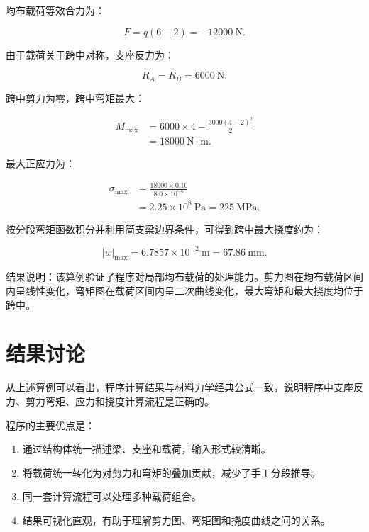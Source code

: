 \documentclass[UTF8,a4paper,12pt]{ctexart}
\numberwithin{equation}{section}
\begin{document}
均布载荷等效合力为：

\begin{equation}
F=q(6-2)=-12000\ \text{N}.
\end{equation}

由于载荷关于跨中对称，支座反力为：

\begin{equation}
R_A=R_B=6000\ \text{N}.
\end{equation}

跨中剪力为零，跨中弯矩最大：

\begin{align}
M_{\max}
&=6000\times4-\frac{3000(4-2)^2}{2}\\
&=18000\ \text{N}\cdot\text{m}.
\end{align}

最大正应力为：

\begin{align}
\sigma_{\max}
&=\frac{18000\times0.10}{8.0\times10^{-6}}\\
&=2.25\times10^8\ \text{Pa}=225\ \text{MPa}.
\end{align}

按分段弯矩函数积分并利用简支梁边界条件，可得到跨中最大挠度约为：

\begin{equation}
|w|_{\max}=6.7857\times10^{-2}\ \text{m}=67.86\ \text{mm}.
\end{equation}

结果说明：该算例验证了程序对局部均布载荷的处理能力。剪力图在均布载荷区间内呈线性变化，弯矩图在载荷区间内呈二次曲线变化，最大弯矩和最大挠度均位于跨中。

\section{结果讨论}

从上述算例可以看出，程序计算结果与材料力学经典公式一致，说明程序中支座反力、剪力弯矩、应力和挠度计算流程是正确的。

程序的主要优点是：

\begin{enumerate}
    \item 通过结构体统一描述梁、支座和载荷，输入形式较清晰。
    \item 将载荷统一转化为对剪力和弯矩的叠加贡献，减少了手工分段推导。
    \item 同一套计算流程可以处理多种载荷组合。
    \item 结果可视化直观，有助于理解剪力图、弯矩图和挠度曲线之间的关系。
\end{enumerate}
\end{document}
